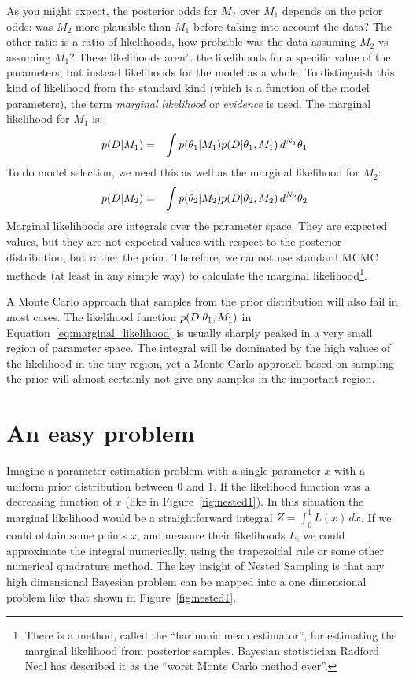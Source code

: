As you might expect, the posterior odds for $M_2$ over $M_1$ depends on the
prior odds: was $M_2$ more plausible than $M_1$ before taking into account the
data? The other ratio is a ratio of likelihoods, how probable was the data
assuming $M_2$ vs assuming $M_1$? These likelihoods aren't the likelihoods
for a specific value of the parameters, but instead likelihoods for the model
as a whole. To distinguish this kind of likelihood from the standard kind (which
is a function of the model parameters), the term {\it marginal likelihood} or
{\it evidence} is used. The marginal likelihood for $M_1$ is:
\begin{eqnarray}
p(D | M_1) &=& \int p(\theta_1 | M_1) p(D | \theta_1, M_1) \, d^{N_1} \theta_1
\label{eq:marginal_likelihood}
\end{eqnarray}
To do model selection, we need this as well as the marginal likelihood for
$M_2$:
\begin{eqnarray}
p(D | M_2) &=& \int p(\theta_2 | M_2) p(D | \theta_2, M_2) \, d^{N_2} \theta_2
\end{eqnarray}
Marginal likelihoods are integrals over the parameter space. They are
expected values, but they are not expected values with respect to the posterior
distribution, but rather the prior. Therefore, we cannot use standard MCMC
methods (at least in any simple way) to calculate the marginal
likelihood\footnote{There is a method, called the ``harmonic mean estimator'',
for estimating the marginal likelihood from posterior samples. Bayesian
statistician Radford Neal has described it as the
``worst Monte Carlo method ever''.}.

A Monte Carlo approach that samples from the prior distribution will also fail
in most cases. The likelihood function $p(D | \theta_1, M_1)$ in
Equation~\ref{eq:marginal_likelihood} is usually sharply peaked in a very
small region of parameter space. The integral will be dominated by the high values
of the likelihood in the tiny region, yet a Monte Carlo approach based on
sampling the prior will almost certainly not give any samples in the important
region.

\section{An easy problem}
Imagine a parameter estimation problem with a single parameter $x$ with a
uniform prior distribution between 0 and 1. If the likelihood function was a
decreasing function of $x$ (like in Figure~\ref{fig:nested1}). In this
situation the marginal likelihood would be a straightforward integral
$Z = \int_0^1 L(x) \,dx$. If we could obtain some points $x$, and measure their
likelihoods $L$, we could approximate the integral numerically, using the
trapezoidal rule or some other numerical quadrature method.
The key insight of Nested Sampling is that any high dimensional Bayesian
problem can be mapped into a one dimensional problem like that shown in
Figure~\ref{fig:nested1}.


